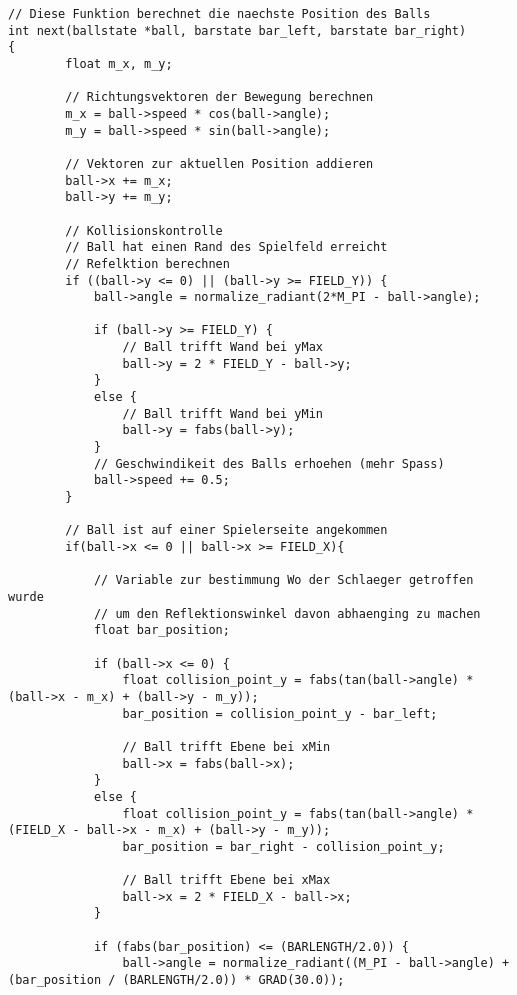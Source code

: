 \begin{lstlisting}[caption=Kernkomponeten der Spiellogik] 
// Diese Funktion berechnet die naechste Position des Balls
int next(ballstate *ball, barstate bar_left, barstate bar_right)
{
        float m_x, m_y;
        
        // Richtungsvektoren der Bewegung berechnen
        m_x = ball->speed * cos(ball->angle);
        m_y = ball->speed * sin(ball->angle);
        
        // Vektoren zur aktuellen Position addieren
        ball->x += m_x;
        ball->y += m_y;
        
        // Kollisionskontrolle
        // Ball hat einen Rand des Spielfeld erreicht
        // Refelktion berechnen
        if ((ball->y <= 0) || (ball->y >= FIELD_Y)) {
            ball->angle = normalize_radiant(2*M_PI - ball->angle);
            
            if (ball->y >= FIELD_Y) {
                // Ball trifft Wand bei yMax
                ball->y = 2 * FIELD_Y - ball->y;
            }
            else {
                // Ball trifft Wand bei yMin
                ball->y = fabs(ball->y);
            }
            // Geschwindikeit des Balls erhoehen (mehr Spass)
            ball->speed += 0.5;
        }
        
        // Ball ist auf einer Spielerseite angekommen
        if(ball->x <= 0 || ball->x >= FIELD_X){

			// Variable zur bestimmung Wo der Schlaeger getroffen wurde
			// um den Reflektionswinkel davon abhaenging zu machen
            float bar_position;
            
            if (ball->x <= 0) {
	            float collision_point_y = fabs(tan(ball->angle) * (ball->x - m_x) + (ball->y - m_y));
                bar_position = collision_point_y - bar_left;

                // Ball trifft Ebene bei xMin
                ball->x = fabs(ball->x);
            }
            else {
	            float collision_point_y = fabs(tan(ball->angle) * (FIELD_X - ball->x - m_x) + (ball->y - m_y));
                bar_position = bar_right - collision_point_y;

                // Ball trifft Ebene bei xMax
                ball->x = 2 * FIELD_X - ball->x;
            }

            if (fabs(bar_position) <= (BARLENGTH/2.0)) {
                ball->angle = normalize_radiant((M_PI - ball->angle) + (bar_position / (BARLENGTH/2.0)) * GRAD(30.0));


\end{lstlisting}
